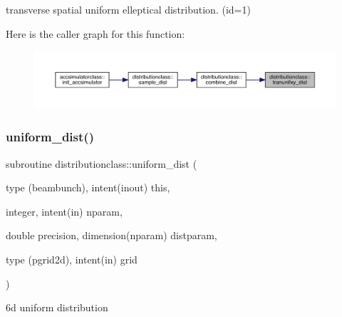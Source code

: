 transverse spatial uniform elleptical distribution. (id=1) 

Here is the caller graph for this function\+:\nopagebreak
\begin{figure}[H]
\begin{center}
\leavevmode
\includegraphics[width=350pt]{namespacedistributionclass_aec8b879df17219ee41f1855623176867_icgraph}
\end{center}
\end{figure}
\mbox{\label{namespacedistributionclass_a5e52f4e8f1be5bbedde152f2263e74af}} 
\subsubsection{\texorpdfstring{uniform\_dist()}{uniform\_dist()}}
{\footnotesize\ttfamily subroutine distributionclass\+::uniform\+\_\+dist (\begin{DoxyParamCaption}\item[{type (beambunch), intent(inout)}]{this,  }\item[{integer, intent(in)}]{nparam,  }\item[{double precision, dimension(nparam)}]{distparam,  }\item[{type (pgrid2d), intent(in)}]{grid }\end{DoxyParamCaption})}



6d uniform distribution 

